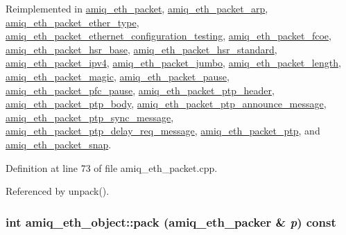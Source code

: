 Reimplemented in \hyperlink{classamiq__eth__packet_a909eb3860185125564fa530496ed1c9e}{amiq\_\-eth\_\-packet}, \hyperlink{classamiq__eth__packet__arp_afa8463360e8e62b24e1171093b00a798}{amiq\_\-eth\_\-packet\_\-arp}, \hyperlink{classamiq__eth__packet__ether__type_a0c86ef80c46bbed384739b23e5efb0ef}{amiq\_\-eth\_\-packet\_\-ether\_\-type}, \hyperlink{classamiq__eth__packet__ethernet__configuration__testing_aff2640ccc3b20b80b16bb6ab20842f76}{amiq\_\-eth\_\-packet\_\-ethernet\_\-configuration\_\-testing}, \hyperlink{classamiq__eth__packet__fcoe_afb550561999badc5693283b852be2f70}{amiq\_\-eth\_\-packet\_\-fcoe}, \hyperlink{classamiq__eth__packet__hsr__base_ae61de71bd90f7a1c605e094845af5ccc}{amiq\_\-eth\_\-packet\_\-hsr\_\-base}, \hyperlink{classamiq__eth__packet__hsr__standard_aac95578ea89db3bd0ec190ca87e731c8}{amiq\_\-eth\_\-packet\_\-hsr\_\-standard}, \hyperlink{classamiq__eth__packet__ipv4_af85e08566b37953edee4566c40400f05}{amiq\_\-eth\_\-packet\_\-ipv4}, \hyperlink{classamiq__eth__packet__jumbo_a2d1f1c25847363d774336f8828384635}{amiq\_\-eth\_\-packet\_\-jumbo}, \hyperlink{classamiq__eth__packet__length_ab496b25828caaf23edd5fa6d4729c578}{amiq\_\-eth\_\-packet\_\-length}, \hyperlink{classamiq__eth__packet__magic_a400a90ae523af44eb0c38ba64ea6afe7}{amiq\_\-eth\_\-packet\_\-magic}, \hyperlink{classamiq__eth__packet__pause_aa458964a73aa61bca99cb30ffa56f54c}{amiq\_\-eth\_\-packet\_\-pause}, \hyperlink{classamiq__eth__packet__pfc__pause_abc86009030a38ab03469c697ffec73f6}{amiq\_\-eth\_\-packet\_\-pfc\_\-pause}, \hyperlink{classamiq__eth__packet__ptp__header_a50b81480d0408ec14a9634e0bc888b4e}{amiq\_\-eth\_\-packet\_\-ptp\_\-header}, \hyperlink{classamiq__eth__packet__ptp__body_a17a10ad537b6553f35b54d2f037d4f0d}{amiq\_\-eth\_\-packet\_\-ptp\_\-body}, \hyperlink{classamiq__eth__packet__ptp__announce__message_ad5f6e496679c3ba130275b5330a23366}{amiq\_\-eth\_\-packet\_\-ptp\_\-announce\_\-message}, \hyperlink{classamiq__eth__packet__ptp__sync__message_ad0756fb94c7d9ea5ea0da34ca6b41a53}{amiq\_\-eth\_\-packet\_\-ptp\_\-sync\_\-message}, \hyperlink{classamiq__eth__packet__ptp__delay__req__message_aadf94c8b12005e5bdcbc01e5ca8adef6}{amiq\_\-eth\_\-packet\_\-ptp\_\-delay\_\-req\_\-message}, \hyperlink{classamiq__eth__packet__ptp_a831addd66dff7e42f2e2e9edb6f976b3}{amiq\_\-eth\_\-packet\_\-ptp}, and \hyperlink{classamiq__eth__packet__snap_a7bb9ce14ff76d5bacb715a53382a7816}{amiq\_\-eth\_\-packet\_\-snap}.

Definition at line 73 of file amiq\_\-eth\_\-packet.cpp.

Referenced by unpack().\hypertarget{classamiq__eth__object_a944b75035d82bb7753dabac0eedd1cc5}{
\subsubsection[{pack}]{\setlength{\rightskip}{0pt plus 5cm}int amiq\_\-eth\_\-object::pack ({\bf amiq\_\-eth\_\-packer} \& {\em p}) const}}
\label{classamiq__eth__object_a944b75035d82bb7753dabac0eedd1cc5}


